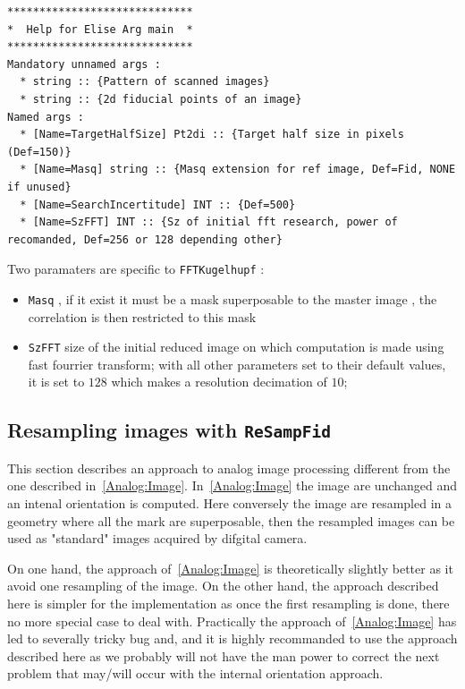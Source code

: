 \begin{verbatim}
*****************************
*  Help for Elise Arg main  *
*****************************
Mandatory unnamed args : 
  * string :: {Pattern of scanned images}
  * string :: {2d fiducial points of an image}
Named args : 
  * [Name=TargetHalfSize] Pt2di :: {Target half size in pixels (Def=150)}
  * [Name=Masq] string :: {Masq extension for ref image, Def=Fid, NONE if unused}
  * [Name=SearchIncertitude] INT :: {Def=500}
  * [Name=SzFFT] INT :: {Sz of initial fft research, power of recomanded, Def=256 or 128 depending other}
\end{verbatim}

Two paramaters are specific to {\tt FFTKugelhupf} :

\begin{itemize}
   \item {\tt Masq} , if it exist it must be a mask superposable to the master image , the correlation is then
         restricted to this mask
   \item {\tt SzFFT} size of the initial reduced image on which computation is made using fast fourrier transform; 
         with all other parameters set to their default values, it is set to $128$ which makes a resolution decimation of $10$;
\end{itemize}

\subsection{Resampling images with {\tt ReSampFid}}

This section describes an approach to analog image processing different from the one described in~\ref{Analog:Image}.
In~\ref{Analog:Image} the image are unchanged and an intenal orientation is computed. Here conversely the image are
resampled in a geometry where all the mark are superposable, then the resampled images can be used as "standard" 
images acquired by difgital camera.

On one hand, the approach of~\ref{Analog:Image} is theoretically slightly better as it avoid
 one resampling of the image. On the other hand, the approach
described here is simpler for the implementation as once the first resampling is done, 
there no more special case to deal with.
Practically the approach of~\ref{Analog:Image} has led to severally tricky bug and, and it is highly recommanded to use
the approach described here as we probably will not have the man power to correct the next problem that may/will occur
with the internal orientation approach.

